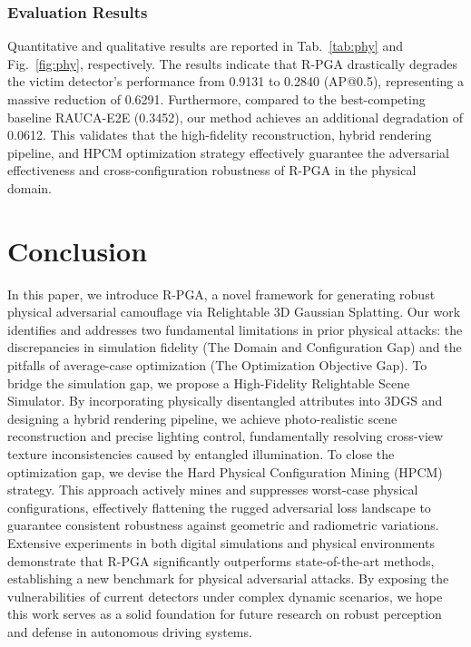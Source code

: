 \documentclass[10pt,journal,compsoc]{IEEEtran}
\begin{document}
\subsubsection{Evaluation Results}


Quantitative and qualitative results are reported in Tab.~\ref{tab:phy} and Fig.~\ref{fig:phy}, respectively. The results indicate that R-PGA drastically degrades the victim detector's performance from 0.9131 to 0.2840 (AP@0.5), representing a massive reduction of 0.6291. Furthermore, compared to the best-competing baseline RAUCA-E2E (0.3452), our method achieves an additional degradation of 0.0612. This validates that the high-fidelity reconstruction, hybrid rendering pipeline, and HPCM optimization strategy effectively guarantee the adversarial effectiveness and cross-configuration robustness of R-PGA in the physical domain.

% 
\section{Conclusion}
In this paper, we introduce R-PGA, a novel framework for generating robust physical adversarial camouflage via Relightable 3D Gaussian Splatting. Our work identifies and addresses two fundamental limitations in prior physical attacks: the discrepancies in simulation fidelity (The Domain and Configuration Gap) and the pitfalls of average-case optimization (The Optimization Objective Gap).
To bridge the simulation gap, we propose a High-Fidelity Relightable Scene Simulator. By incorporating physically disentangled attributes into 3DGS and designing a hybrid rendering pipeline, we achieve photo-realistic scene reconstruction and precise lighting control, fundamentally resolving cross-view texture inconsistencies caused by entangled illumination. To close the optimization gap, we devise the Hard Physical Configuration Mining (HPCM) strategy. This approach actively mines and suppresses worst-case physical configurations, effectively flattening the rugged adversarial loss landscape to guarantee consistent robustness against geometric and radiometric variations.
Extensive experiments in both digital simulations and physical environments  demonstrate that R-PGA significantly outperforms state-of-the-art methods, establishing a new benchmark for physical adversarial attacks. By exposing the vulnerabilities of current detectors under complex dynamic scenarios, we hope this work serves as a solid foundation for future research on robust perception and defense in autonomous driving systems.
\end{document}
